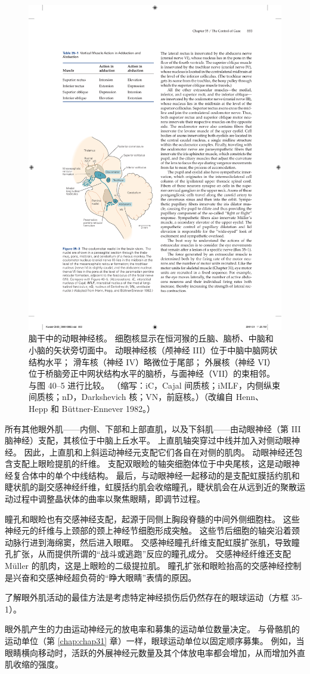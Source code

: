 \begin{figure}[htbp]
	\centering
	\includegraphics[width=0.5\linewidth]{chap35/fig_35_3}
	\caption{脑干中的动眼神经核。 细胞核显示在恒河猴的丘脑、脑桥、中脑和小脑的矢状旁切面中。 动眼神经核（颅神经 III）位于中脑中脑网状结构水平； 滑车核（神经 IV）略微位于尾部； 外展核（神经 VI）位于桥脑旁正中网状结构水平的脑桥，与面神经（VII）的束相邻。 与图 40–5 进行比较。 （缩写：iC，Cajal 间质核；iMLF，内侧纵束间质核；nD，Darkshevich 核；VN，前庭核。）（改编自 Henn、Hepp 和 Büttner-Ennever 1982。）}
	\label{fig:35_3}
\end{figure}


所有其他眼外肌——内侧、下部和上部直肌，以及下斜肌——由动眼神经（第 III 脑神经）支配，其核位于中脑上丘水平。
上直肌轴突穿过中线并加入对侧动眼神经。
因此，上直肌和上斜运动神经元支配它们各自在对侧的肌肉。
动眼神经还包含支配上眼睑提肌的纤维。
支配双眼睑的轴突细胞体位于中央尾核，这是动眼神经复合体中的单个中线结构。
最后，与动眼神经一起移动的是支配虹膜括约肌和睫状肌的副交感神经纤维，虹膜括约肌会收缩瞳孔，睫状肌会在从远到近的聚散运动过程中调整晶状体的曲率以聚焦眼睛，即调节过程。


瞳孔和眼睑也有交感神经支配，起源于同侧上胸段脊髓的中间外侧细胞柱。
这些神经元的纤维与上颈部的颈上神经节细胞形成突触。
这些节后细胞的轴突沿着颈动脉行进到海绵窦，然后进入眼眶。
交感神经瞳孔纤维支配虹膜扩张肌，导致瞳孔扩张，从而提供所谓的“战斗或逃跑”反应的瞳孔成分。
交感神经纤维还支配 Müller 的肌肉，这是上眼睑的二级提拉肌。
瞳孔扩张和眼睑抬高的交感神经控制是兴奋和交感神经超负荷的“睁大眼睛”表情的原因。



了解眼外肌活动的最佳方法是考虑特定神经损伤后仍然存在的眼球运动（方框 35-1）。


眼外肌产生的力由运动神经元的放电率和募集的运动单位数量决定。
与骨骼肌的运动单位（第 \ref{chap:chap31} 章）一样，眼球运动单位以固定顺序募集。
例如，当眼睛横向移动时，活跃的外展神经元数量及其个体放电率都会增加，从而增加外直肌收缩的强度。


